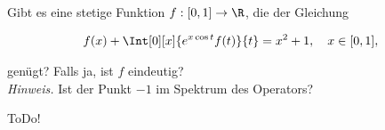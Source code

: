 \begin{exercise}[IO/5]

Gibt es eine stetige Funktion $f: [0, 1] \to \R$, die der Gleichung

\begin{align*}
  f(x) + \Int[0][x]{e^{x \cos{t}} f(t)}{t}
  =
  x^2 + 1,
  \quad
  x \in [0, 1],
\end{align*}

genügt?
Falls ja, ist $f$ eindeutig? \\

\textit{Hinweis.}
Ist der Punkt $-1$ im Spektrum des Operators?

\end{exercise}

\begin{solution}

ToDo!

\end{solution}
